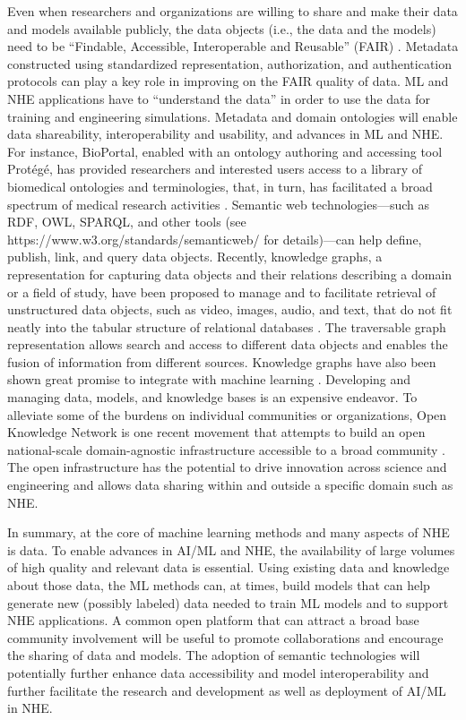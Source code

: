 Even when researchers and organizations are willing to share and make their data and models available publicly, the data objects (i.e., the data and the models) need to be ``Findable, Accessible, Interoperable and Reusable'' (FAIR) \citep{wilkinson2016fair}. Metadata constructed using standardized representation, authorization, and authentication protocols can play a key role in improving on the FAIR quality of data. ML and NHE applications have to ``understand the data'' in order to use the data for training and engineering simulations. Metadata and domain ontologies will enable data shareability, interoperability and usability, and advances in ML and NHE. For instance, BioPortal, enabled with an ontology authoring and accessing tool Protégé, has provided researchers and interested users access to a library of biomedical ontologies and terminologies, that, in turn, has facilitated a broad spectrum of medical research activities \citep{whetzel2011bioportal}. Semantic web technologies—such as RDF, OWL, SPARQL, and other tools (see https://www.w3.org/standards/semanticweb/ for details)—can help define, publish, link, and query data objects. Recently, knowledge graphs, a representation for capturing data objects and their relations describing a domain or a field of study, have been proposed to manage and to facilitate retrieval of unstructured data objects, such as video, images, audio, and text, that do not fit neatly into the tabular structure of relational databases \citep{paulheim2016knowledge,bonatti2018knowledge,reinanda2020knowledge}. The traversable graph representation allows search and access to different data objects and enables the fusion of information from different sources. Knowledge graphs have also been shown great promise to integrate with machine learning \citep{lin2018multihop}. Developing and managing data, models, and knowledge bases is an expensive endeavor. To alleviate some of the burdens on individual communities or organizations, Open Knowledge Network is one recent movement that attempts to build an open national-scale domain-agnostic infrastructure accessible to a broad community \citep{baru2017open}. The open infrastructure has the potential to drive innovation across science and engineering and allows data sharing within and outside a specific domain such as NHE.

In summary, at the core of machine learning methods and many aspects of NHE is data. To enable advances in AI/ML and NHE, the availability of large volumes of high quality and relevant data is essential. Using existing data and knowledge about those data, the ML methods can, at times, build models that can help generate new (possibly labeled) data needed to train ML models and to support NHE applications. A common open platform that can attract a broad base community involvement will be useful to promote collaborations and encourage the sharing of data and models. The adoption of semantic technologies will potentially further enhance data accessibility and model interoperability and further facilitate the research and development as well as deployment of AI/ML in NHE. 

